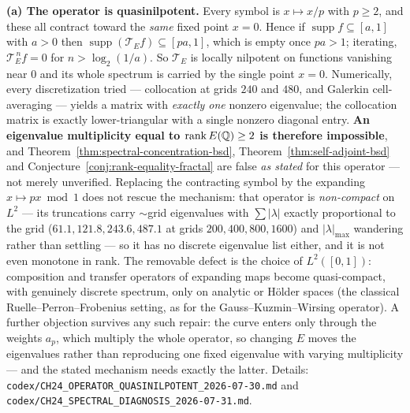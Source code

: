 \begin{remark}
\textbf{(a) The operator is quasinilpotent.}  Every symbol is $x \mapsto x/p$
with $p \ge 2$, and these all contract toward the \emph{same} fixed point
$x=0$.  Hence if $\operatorname{supp} f \subseteq [a,1]$ with $a>0$ then
$\operatorname{supp}(\mathcal{T}_Ef) \subseteq [pa,1]$, which is empty once
$pa>1$; iterating, $\mathcal{T}_E^{\,n} f = 0$ for $n > \log_2(1/a)$.  So
$\mathcal{T}_E$ is locally nilpotent on functions vanishing near $0$ and its
whole spectrum is carried by the single point $x=0$.  Numerically, every
discretization tried --- collocation at grids $240$ and $480$, and Galerkin
cell-averaging --- yields a matrix with \emph{exactly one} nonzero eigenvalue;
the collocation matrix is exactly lower-triangular with a single nonzero
diagonal entry.  \textbf{An eigenvalue multiplicity equal to
$\operatorname{rank} E(\mathbb{Q}) \ge 2$ is therefore impossible}, and
Theorem~\ref{thm:spectral-concentration-bsd},
Theorem~\ref{thm:self-adjoint-bsd} and
Conjecture~\ref{conj:rank-equality-fractal} are false \emph{as stated} for this
operator --- not merely unverified.  Replacing the contracting symbol by the
expanding $x \mapsto px \bmod 1$ does not rescue the mechanism: that operator is
\emph{non-compact} on $L^2$ --- its truncations carry $\sim$grid eigenvalues with
$\sum|\lambda|$ exactly proportional to the grid ($61.1, 121.8, 243.6, 487.1$ at
grids $200,400,800,1600$) and $|\lambda|_{\max}$ wandering rather than settling
--- so it has no discrete eigenvalue list either, and it is not even monotone in
rank.  The removable defect is the choice of $L^2([0,1])$: composition and
transfer operators of expanding maps become quasi-compact, with genuinely
discrete spectrum, only on analytic or H\"older spaces (the classical
Ruelle--Perron--Frobenius setting, as for the Gauss--Kuzmin--Wirsing operator).
A further objection survives any such repair: the curve enters only through the
weights $a_p$, which multiply the whole operator, so changing $E$ moves the
eigenvalues rather than reproducing one fixed eigenvalue with varying
multiplicity --- and the stated mechanism needs exactly the latter.  Details:
\texttt{codex/CH24\_OPERATOR\_QUASINILPOTENT\_2026-07-30.md} and
\texttt{codex/CH24\_SPECTRAL\_DIAGNOSIS\_2026-07-31.md}.


\end{remark}
